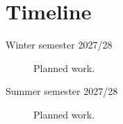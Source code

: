 \chapter{Timeline}
\label{ch:timeline}

\begin{description}
\item[Winter semester 2027/28] Planned work.
\item[Summer semester 2027/28] Planned work.
\end{description}
